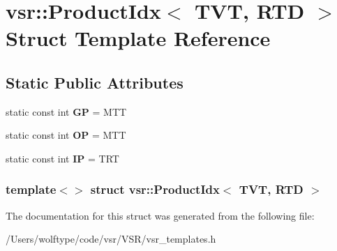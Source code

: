\hypertarget{structvsr_1_1_product_idx_3_01_t_v_t_00_01_r_t_d_01_4}{\section{vsr\-:\-:Product\-Idx$<$ T\-V\-T, R\-T\-D $>$ Struct Template Reference}
\label{structvsr_1_1_product_idx_3_01_t_v_t_00_01_r_t_d_01_4}
}
\subsection*{Static Public Attributes}
\begin{DoxyCompactItemize}
\item 
\hypertarget{structvsr_1_1_product_idx_3_01_t_v_t_00_01_r_t_d_01_4_a87bc870fdf4521e9d6b4a28c05dde5f5}{static const int {\bfseries G\-P} = M\-T\-T}\label{structvsr_1_1_product_idx_3_01_t_v_t_00_01_r_t_d_01_4_a87bc870fdf4521e9d6b4a28c05dde5f5}

\item 
\hypertarget{structvsr_1_1_product_idx_3_01_t_v_t_00_01_r_t_d_01_4_a5fcc60f3db94800868cb30ac755177db}{static const int {\bfseries O\-P} = M\-T\-T}\label{structvsr_1_1_product_idx_3_01_t_v_t_00_01_r_t_d_01_4_a5fcc60f3db94800868cb30ac755177db}

\item 
\hypertarget{structvsr_1_1_product_idx_3_01_t_v_t_00_01_r_t_d_01_4_aa4a497363c0b0c445fdd67111eac3667}{static const int {\bfseries I\-P} = T\-R\-T}\label{structvsr_1_1_product_idx_3_01_t_v_t_00_01_r_t_d_01_4_aa4a497363c0b0c445fdd67111eac3667}

\end{DoxyCompactItemize}
\subsubsection*{template$<$$>$ struct vsr\-::\-Product\-Idx$<$ T\-V\-T, R\-T\-D $>$}



The documentation for this struct was generated from the following file\-:\begin{DoxyCompactItemize}
\item 
/\-Users/wolftype/code/vsr/\-V\-S\-R/vsr\-\_\-templates.\-h\end{DoxyCompactItemize}
